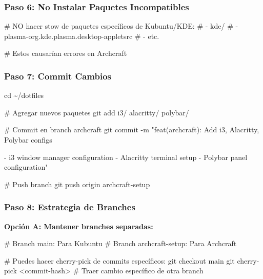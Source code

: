 \documentclass[
  doc,
  floatsintext,
  longtable,
  a4paper,
  nolmodern,
  notxfonts,
  notimes,
  12pt,
  colorlinks=true,linkcolor=blue,citecolor=blue,urlcolor=blue]{apa7}
\newenvironment{Shaded}{\begin{snugshade}}{\end{snugshade}}
\newcommand{\AttributeTok}[1]{\textcolor[rgb]{0.40,0.45,0.13}{#1}}
\newcommand{\BuiltInTok}[1]{\textcolor[rgb]{0.00,0.23,0.31}{#1}}
\newcommand{\CommentTok}[1]{\textcolor[rgb]{0.37,0.37,0.37}{#1}}
\newcommand{\FunctionTok}[1]{\textcolor[rgb]{0.28,0.35,0.67}{#1}}
\newcommand{\NormalTok}[1]{\textcolor[rgb]{0.00,0.23,0.31}{#1}}
\newcommand{\OperatorTok}[1]{\textcolor[rgb]{0.37,0.37,0.37}{#1}}
\newcommand{\StringTok}[1]{\textcolor[rgb]{0.13,0.47,0.30}{#1}}
\begin{document}
\subsubsection{Paso 6: No Instalar Paquetes
Incompatibles}\label{paso-6-no-instalar-paquetes-incompatibles}

\begin{Shaded}
\begin{Highlighting}[]
\CommentTok{\# NO hacer stow de paquetes específicos de Kubuntu/KDE:}
\CommentTok{\# {-} kde/}
\CommentTok{\# {-} plasma{-}org.kde.plasma.desktop{-}appletsrc}
\CommentTok{\# {-} etc.}

\CommentTok{\# Estos causarían errores en Archcraft}
\end{Highlighting}
\end{Shaded}

\subsubsection{Paso 7: Commit Cambios}\label{paso-7-commit-cambios}

\begin{Shaded}
\begin{Highlighting}[]
\BuiltInTok{cd}\NormalTok{ \textasciitilde{}/dotfiles}

\CommentTok{\# Agregar nuevos paquetes}
\FunctionTok{git}\NormalTok{ add i3/ alacritty/ polybar/}

\CommentTok{\# Commit en branch archcraft}
\FunctionTok{git}\NormalTok{ commit }\AttributeTok{{-}m} \StringTok{"feat(archcraft): Add i3, Alacritty, Polybar configs}

\StringTok{{-} i3 window manager configuration}
\StringTok{{-} Alacritty terminal setup}
\StringTok{{-} Polybar panel configuration"}

\CommentTok{\# Push branch}
\FunctionTok{git}\NormalTok{ push origin archcraft{-}setup}
\end{Highlighting}
\end{Shaded}

\subsubsection{Paso 8: Estrategia de
Branches}\label{paso-8-estrategia-de-branches}

\textbf{Opción A: Mantener branches separadas:}

\begin{Shaded}
\begin{Highlighting}[]
\CommentTok{\# Branch main: Para Kubuntu}
\CommentTok{\# Branch archcraft{-}setup: Para Archcraft}

\CommentTok{\# Puedes hacer cherry{-}pick de commits específicos:}
\FunctionTok{git}\NormalTok{ checkout main}
\FunctionTok{git}\NormalTok{ cherry{-}pick }\OperatorTok{\textless{}}\NormalTok{commit{-}hash}\OperatorTok{\textgreater{}}  \CommentTok{\# Traer cambio específico de otra branch}
\end{Highlighting}
\end{Shaded}
\end{document}
